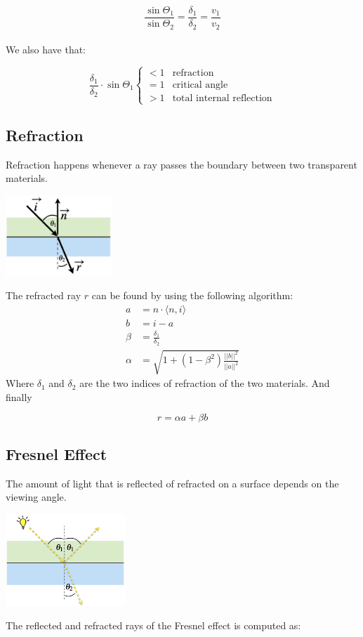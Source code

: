 \documentclass{article}
\begin{document}
\[ \frac{\sin \Theta_1}{\sin \Theta_2} = \frac{\delta_1}{\delta_2} = \frac{v_1}{v_2} \] \\
We also have that:

\[ \frac{\delta_1}{\delta_2} \cdot \sin \Theta_1 \begin{cases} < 1 & \text{refraction} \\ = 1 & \text{critical angle} \\ > 1 & \text{total internal reflection} \end{cases} \]

\subsection{Refraction}
Refraction happens whenever a ray passes the boundary between two transparent materials. \\

\begin{center}
	\includegraphics[width=4cm]{refrac.png}
\end{center}
\vspace{.3cm}
The refracted ray $r$ can be found by using the following algorithm:
\begin{align*}
	a &= n \cdot \langle n, i \rangle \\
	b &= i - a \\
	\beta &= \frac{\delta_1}{\delta_2} \\
	\alpha &= \sqrt{1 + ( 1 - \beta^2) \frac{||b||^2}{||a||^2}}
\end{align*}
Where $\delta_1$ and $\delta_2$ are the two indices of refraction of the two materials. And finally

\[ r = \alpha a + \beta b \]

\subsection{Fresnel Effect}
The amount of light that is reflected of refracted on a surface depends on the viewing angle. \\

\begin{center}
	\includegraphics[width=4.5cm]{fresnel.png}
\end{center}
\vspace{.3cm}
The reflected and refracted rays of the Fresnel effect is computed as:
\end{document}
